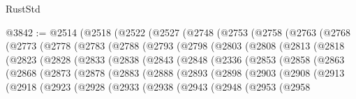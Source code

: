 \begin{lexlean}{RustStd}
\begin{coremodule}
{\begin{coremodule}
{{{{{{{{{{{{{{{{{{{{{{{{{{{{{{{{{{{{{{{{{{{{{{{{{{{{{{{{{{{{{{{{{{{{{{{{{{{{{{{{@3842 := @2514
    (@2518
      (@2522
        (@2527
          (@2748
            (@2753
              (@2758
                (@2763
                  (@2768
                    (@2773
                      (@2778
                        (@2783
                          (@2788
                            (@2793
                              (@2798
                                (@2803
                                  (@2808
                                    (@2813
                                      (@2818
                                        (@2823
                                          (@2828
                                            (@2833
                                              (@2838
                                                (@2843
                                                  (@2848
                                                    (@2336
                                                      (@2853
                                                        (@2858
                                                          (@2863
                                                            (@2868
                                                              (@2873
                                                                (@2878
                                                                  (@2883
                                                                    (@2888
                                                                      (@2893
                                                                        (@2898
                                                                          (@2903
                                                                            (@2908
                                                                              (@2913
                                                                                (@2918
                                                                                  (@2923
                                                                                    (@2928
                                                                                      (@2933
                                                                                        (@2938
                                                                                          (@2943
                                                                                            (@2948
                                                                                              (@2953
                                                                                                (@2958
}}}}}}}}}}}}}}}}}}}}}}}}}}}}}}}}}}}}}}}}}}}}}}}}}}}}}}}}}}}}}}}}}}}}}}}}}}}}}}}}
\end{coremodule}}
\end{coremodule}
\end{lexlean}
